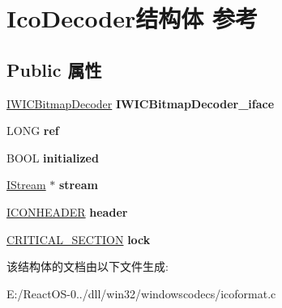\hypertarget{struct_ico_decoder}{}\section{Ico\+Decoder结构体 参考}
\label{struct_ico_decoder}
\subsection*{Public 属性}
\begin{DoxyCompactItemize}
\item 
\mbox{\label{struct_ico_decoder_abc68694e19785a98409652cfac16ca8d}} 
\hyperlink{interface_i_w_i_c_bitmap_decoder}{I\+W\+I\+C\+Bitmap\+Decoder} {\bfseries I\+W\+I\+C\+Bitmap\+Decoder\+\_\+iface}
\item 
\mbox{\label{struct_ico_decoder_a52084bcba93a8708388696270ac8d729}} 
L\+O\+NG {\bfseries ref}
\item 
\mbox{\label{struct_ico_decoder_a86c5c4f87889d669d4d7ac072b1549ed}} 
B\+O\+OL {\bfseries initialized}
\item 
\mbox{\label{struct_ico_decoder_aeaa188e587f3ce378783644dea4a1dd9}} 
\hyperlink{interface_i_stream}{I\+Stream} $\ast$ {\bfseries stream}
\item 
\mbox{\label{struct_ico_decoder_a194ec17079d1694f0091b82cf776b6db}} 
\hyperlink{struct_i_c_o_n_h_e_a_d_e_r}{I\+C\+O\+N\+H\+E\+A\+D\+ER} {\bfseries header}
\item 
\mbox{\label{struct_ico_decoder_afca84fa5cdef3bd84080e583f7c6dfc5}} 
\hyperlink{struct___c_r_i_t_i_c_a_l___s_e_c_t_i_o_n}{C\+R\+I\+T\+I\+C\+A\+L\+\_\+\+S\+E\+C\+T\+I\+ON} {\bfseries lock}
\end{DoxyCompactItemize}


该结构体的文档由以下文件生成\+:\begin{DoxyCompactItemize}
\item 
E\+:/\+React\+O\+S-\/0../dll/win32/windowscodecs/icoformat.\+c\end{DoxyCompactItemize}
